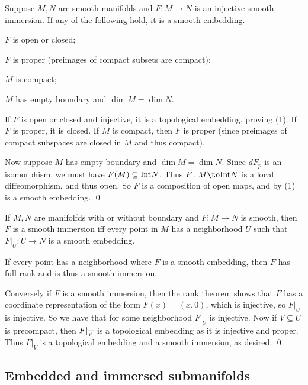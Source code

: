 \bprop

    Suppose $M,N$ are smooth manifolds and $F\colon M\to N$ is an injective smooth immersion.
    If any of the following hold, it is a smooth embedding.
    \benum
        \item $F$ is open or closed;
        \item $F$ is proper (preimages of compact subsets are compact);
        \item $M$ is compact;
        \item $M$ has empty boundary and $\dim M=\dim N$.
    \eenum

\eprop

\bproof

    If $F$ is open or closed and injective, it is a topological embedding, proving (1).
    If $F$ is proper, it is closed.
    If $M$ is compact, then $F$ is proper (since preimages of compact subspaces are closed in $M$ and thus compact).

    Now suppose $M$ has empty boundary and $\dim M=\dim N$.
    Since $dF_p$ is an isomorphism, we must have $F(M)\subseteq{\rm Int} N$.
    Thus $F\colon M\to\Int N$ is a local diffeomorphism, and thus open.
    So $F$ is a composition of open maps, and by (1) is a smooth embedding.
    \qed

\eproof

\bthrm[title=Local embedding theorem]

    If $M,N$ are manifolfds with or without boundary and $F\colon M\to N$ is smooth, then $F$ is a smooth immersion
    iff every point in $M$ has a neighborhood $U$ such that $F|_U\colon U\to N$ is a smooth embedding.

\ethrm

\bproof

    If every point has a neighborhood where $F$ is a smooth embedding, then $F$ has full rank and is thus a smooth
    immersion.

    Conversely if $F$ is a smooth immersion, then the rank theorem shows that $F$ has a coordinate representation
    of the form $F(\bar x)=(\bar x,0)$, which is injective, so $F|_U$ is injective.
    So we have that for some neighborhood $F|_U$ is injective.
    Now if $V\subseteq U$ is precompact, then $F|_{\overline V}$ is a topological embedding as it is injective and proper.
    Thus $F|_V$ is a topological embedding and a smooth immersion, as desired.
    \qed

\eproof

\subsection{Embedded and immersed submanifolds}

